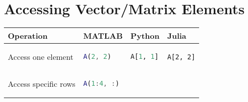\documentclass[]{article}
\begin{document}
\section{Accessing Vector/Matrix
Elements}\label{accessing-vectormatrix-elements}

\begin{longtable}[]{@{}llll@{}}
\toprule
\begin{minipage}[b]{0.23\columnwidth}\raggedright\strut
Operation\strut
\end{minipage} & \begin{minipage}[b]{0.23\columnwidth}\raggedright\strut
MATLAB\strut
\end{minipage} & \begin{minipage}[b]{0.23\columnwidth}\raggedright\strut
Python\strut
\end{minipage} & \begin{minipage}[b]{0.20\columnwidth}\raggedright\strut
Julia\strut
\end{minipage}\tabularnewline
\midrule
\endhead
\begin{minipage}[t]{0.23\columnwidth}\raggedright\strut
Access one element\strut
\end{minipage} & \begin{minipage}[t]{0.23\columnwidth}\raggedright\strut
\begin{lstlisting}[language=Matlab]
A(2, 2)
\end{lstlisting}
\strut
\end{minipage} & \begin{minipage}[t]{0.23\columnwidth}\raggedright\strut
\begin{lstlisting}[language=Python]
A[1, 1]
\end{lstlisting}
\strut
\end{minipage} & \begin{minipage}[t]{0.20\columnwidth}\raggedright\strut
\begin{lstlisting}
A[2, 2]
\end{lstlisting}
\strut
\end{minipage}\tabularnewline
\begin{minipage}[t]{0.23\columnwidth}\raggedright\strut
Access specific rows\strut
\end{minipage} & \begin{minipage}[t]{0.23\columnwidth}\raggedright\strut
\begin{lstlisting}[language=Matlab]
A(1:4, :)
\end{lstlisting}
\strut
\end{minipage} & \begin{minipage}[t]{0.23\columnwidth}\raggedright\strut

\end{minipage}
\end{longtable}
\end{document}
